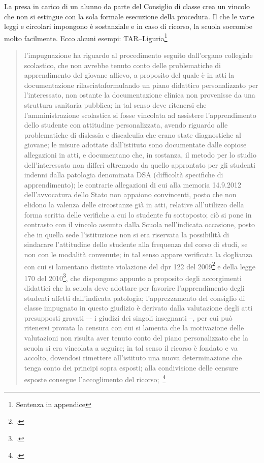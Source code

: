 La presa in carico di un alunno da parte del Consiglio di classe crea un vincolo che non si estingue con la sola formale esecuzione della procedura. Il  che le varie leggi e circolari impongono è sostanziale e in caso di ricorso, la scuola soccombe molto facilmente. Ecco alcuni esempi:
TAR--Liguria\footnote{Sentenza in appendice}
\begin{quote}
	\mancatesto
	l'impugnazione ha riguardo al procedimento seguito dall'organo collegiale
	scolastico, che non avrebbe tenuto conto delle problematiche di apprendimento
	del giovane allievo, a proposito del quale è in atti la documentazione rilasciata\mancatesto formulando un piano didattico personalizzato
	per l'interessato, non ostante la documentazione clinica non provenisse da una
	struttura sanitaria pubblica;
	in tal senso deve ritenersi che l'amministrazione scolastica si fosse vincolata ad
	assistere l'apprendimento dello studente con attitudine personalizzata, avendo
	riguardo alle problematiche di dislessia e discalculia che erano state diagnostiche al
	giovane;
	le misure adottate dall'istituto sono documentate dalle copiose allegazioni in atti, e
	documentano che, in sostanza, il metodo per lo studio dell'interessato non differì
	oltremodo da quello approntato per gli studenti indenni dalla patologia
	denominata DSA (difficoltà specifiche di apprendimento);
	le contrarie allegazioni di cui alla memoria 14.9.2012 dell'avvocatura dello Stato
	non appaiono convincenti, posto che non elidono la valenza delle circostanze già
	in atti, relative all'utilizzo della forma scritta delle verifiche a cui lo studente fu
	sottoposto;
	ciò si pone in contrasto con il vincolo assunto dalla Scuola nell'indicata occasione,
	posto che in quella sede l'istituzione non si era riservata la possibilità di sindacare
	l'attitudine dello studente alla frequenza del corso di studi, se non con le modalità
	convenute;
	in tal senso appare verificata la doglianza con cui si lamentano distinte violazione
	del dpr 122 del 2009\footcite{DPR_122_2009} e della legge 170 del 2010\footcite{legge170}, che dispongono appunto a
	proposito degli accorgimenti didattici che la scuola deve adottare per favorire
	l'apprendimento degli studenti affetti dall'indicata patologia;
	l'apprezzamento del consiglio di classe impugnato in questo giudizio è derivato
	dalla valutazione degli atti presupposti gravati –- i giudizi dei singoli insegnanti --,
	per cui può ritenersi provata la censura con cui si lamenta che la motivazione delle valutazioni non risulta aver tenuto conto del piano personalizzato che la scuola
	si era vincolata a seguire;
	in tal senso il ricorso è fondato e va accolto, dovendosi rimettere all'istituto una
	nuova determinazione che tenga conto dei principi sopra esposti;
	alla condivisione delle censure esposte consegue l'accoglimento del ricorso;~\footcite{tarliguria1178}\mancatesto
\end{quote}
